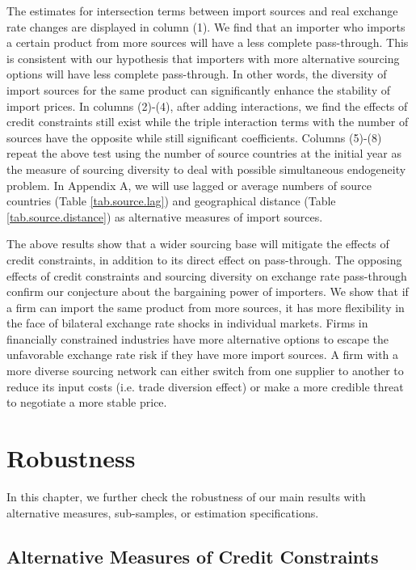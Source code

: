 \documentclass[12pt]{article}
\begin{document}
The estimates for intersection terms between import sources and real exchange rate changes are displayed in column (1). We find that an importer who imports a certain product from more sources will have a less complete pass-through. This is consistent with our hypothesis that importers with more alternative sourcing options will have less complete pass-through. In other words, the diversity of import sources for the same product can significantly enhance the stability of import prices. In columns (2)-(4), after adding interactions, we find the effects of credit constraints still exist while the triple interaction terms with the number of sources have the opposite while still significant coefficients. Columns (5)-(8) repeat the above test using the number of source countries at the initial year as the measure of sourcing diversity to deal with possible simultaneous endogeneity problem. In Appendix A, we will use lagged or average numbers of source countries (Table \ref{tab.source.lag}) and geographical distance (Table \ref{tab.source.distance}) as alternative measures of import sources.

The above results show that a wider sourcing base will mitigate the effects of credit constraints, in addition to its direct effect on pass-through. The opposing effects of credit constraints and sourcing diversity on exchange rate pass-through confirm our conjecture about the bargaining power of importers. We show that if a firm can import the same product from more sources, it has more flexibility in the face of bilateral exchange rate shocks in individual markets. Firms in financially constrained industries have more alternative options to escape the unfavorable exchange rate risk if they have more import sources. A firm with a more diverse sourcing network can either switch from one supplier to another to reduce its input costs (i.e. trade diversion effect) or make a more credible threat to negotiate a more stable price.

\section{Robustness} \label{Robustness}

In this chapter, we further check the robustness of our main results with alternative measures,  sub-samples, or estimation specifications.

\subsection{Alternative Measures of Credit Constraints}
\end{document}
